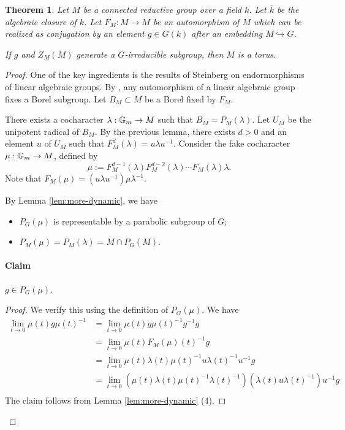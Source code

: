 \documentclass[10pt,a4paper,twoside]{article}
\newtheorem{thm}{Theorem}
\begin{document}
\begin{thm}
\label{thm:sw-irr}
Let $M$ be a connected reductive group over a field $k$.
Let $\bar k$ be the algebraic closure of $k$.
Let $F_M : M\to M$ be an automorphism of $M$ which can be realized
as conjugation by an element $g\in G(k)$ after an embedding
$M \hookrightarrow G$.

If $g$ and $Z_M(M)$ generate a $G$-irreducible subgroup,
then $M$ is a torus.
\end{thm}

\begin{proof}
One of the key ingredients is the results of Steinberg on endormorphisms of
linear algebraic groups.
By \cite[Theorem 7.2]{St68}, any automorphism of a linear algebraic group fixes a Borel subgroup.
Let $B_M\subset M$ be a Borel fixed by $F_M$.

There exists a cocharacter $\lambda:\mathbb{G}_m\to M$ such that $B_M = P_M(\lambda)$.
Let $U_M$ be the unipotent radical of $B_M$.
By the previous lemma, there exists $d>0$ and an element $u$ of $U_M$
such that $F_M^d(\lambda) = u \lambda u^{-1}$.
Consider the fake cocharacter $\mu:\mathbb{G}_m\to M$, defined by
$$
\mu := F_M^{d-1}(\lambda)F_M^{d-2}(\lambda) \cdots F_M(\lambda)\lambda.
$$
Note that
$F_M(\mu) = (u \lambda u^{-1}) \mu \lambda^{-1}$.

By Lemma \ref{lem:more-dynamic}, we have
\begin{itemize}
\item[(i)]  $P_G(\mu)$ is representable by a parabolic subgroup of $G$;
\item[(ii)] $P_M(\mu) = P_M(\lambda) = M \cap P_G(M)$.
\end{itemize}


\paragraph{\bf Claim} $g \in P_G(\mu)$.

\begin{proof}
We verify this using the definition of $P_G(\mu)$.
We have
\begin{align*}
\lim_{t\to 0}\mu(t) g  \mu(t)^{-1}
&=
\lim_{t\to 0}\mu(t) g  \mu(t)^{-1} g  ^{-1} g  \\
&=
\lim_{t\to 0}\mu(t)F_M(\mu)(t)^{-1} g  \\
&=
\lim_{t\to 0}\mu(t) \lambda(t) \mu(t)^{-1}u\lambda(t)^{-1}u^{-1}  g  \\
&=
\lim_{t\to 0}(\mu(t) \lambda(t) \mu(t)^{-1}\lambda(t)^{-1})(\lambda(t)u\lambda(t)^{-1})u^{-1}  g  \\
\end{align*}
The claim follows from Lemma \ref{lem:more-dynamic} (4).
\end{proof}


\end{proof}
\end{document}
